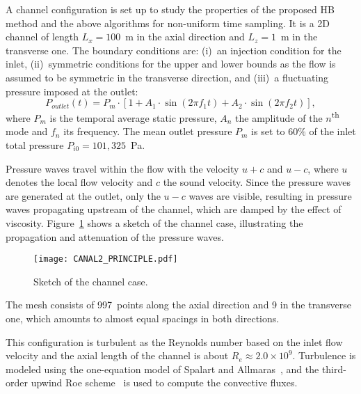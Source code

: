 
A channel configuration is set up to study the properties of the
proposed HB method and the above algorithms for non-uniform time
sampling.  It is a 2D channel of length $L_x = 100$~m in the axial
direction and $L_z = 1$~m in the transverse one.  The boundary
conditions are: (i)~an injection condition for the inlet,
(ii)~symmetric conditions for the upper and lower bounds as the flow
is assumed to be symmetric in the transverse direction, and (iii)~a
fluctuating pressure imposed at the outlet:
\begin{equation}
  P_{outlet}(t) = P_m \cdot \left[1 + A_1 \cdot \sin(2 \pi f_1 t) +
    A_2 \cdot \sin(2 \pi f_2 t) \right],
  \label{eq:outlet_canal}
\end{equation}
where $P_m$ is the temporal average static pressure, $A_n$ the
amplitude of the $n$\textsuperscript{th} mode and $f_n$ its
frequency. The mean outlet pressure $P_m$ is set to $60\%$ of the
inlet total pressure $P_{i0} = 101,325$~Pa.

Pressure waves travel within the flow with the velocity $u + c$ and $u
- c$, where $u$ denotes the local flow velocity and $c$ the sound
velocity. Since the pressure waves are generated at the outlet, only
the $u-c$ waves are visible, resulting in pressure waves propagating
upstream of the channel, which are damped by the effect of
viscosity. Figure~\ref{fig:canal_principle} shows a sketch
of the channel case, illustrating the propagation and attenuation of
the pressure waves.
\begin{figure}[htb]
  \centering
  \texttt{[image: CANAL2\_PRINCIPLE.pdf]}
  \caption{Sketch of the channel case.}
  \label{fig:canal_principle}
\end{figure}

The mesh consists of 997~points along the axial direction and 9 in the
transverse one, which amounts to almost equal spacings in both
directions.

This configuration is turbulent as the Reynolds number based on the
inlet flow velocity and the axial length of the channel is about $R_e
\approx 2.0 \times 10^9$.  Turbulence is modeled using the
one-equation model of Spalart and Allmaras~\cite{Spalart1992}, and the
third-order upwind Roe scheme~\cite{Roe1981} is used to compute the
convective fluxes.